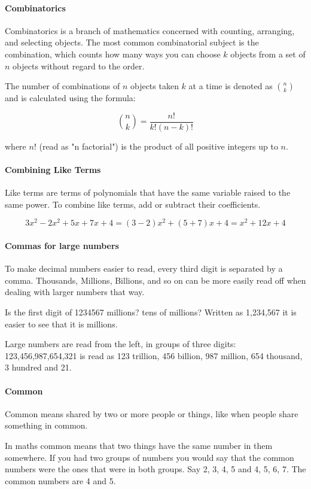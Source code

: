 \documentclass[12pt]{article}
\begin{document}
\paragraph{Combinatorics}
Combinatorics is a branch of mathematics concerned with counting, arranging, and selecting objects. The most common combinatorial subject is the combination, which counts how many ways you can choose \(k\) objects from a set of \(n\) objects without regard to the order.

The number of combinations of \(n\) objects taken \(k\) at a time is denoted as \(\binom{n}{k}\) and is calculated using the formula:

\[ \binom{n}{k} = \frac{n!}{k!(n-k)!} \]

where \(n!\) (read as "n factorial") is the product of all positive integers up to \(n\).

\paragraph{Combining Like Terms}
Like terms are terms of polynomials that have the same variable raised to the same power. To combine like terms, add or subtract their coefficients.

\[
3x^2 - 2x^2 + 5x + 7x + 4 = (3 - 2)x^2 + (5 + 7)x + 4 = x^2 + 12x + 4
\]

\paragraph{Commas for large numbers}
To make decimal numbers easier to read, every third digit is separated by a comma. Thousands, Millions, Billions, and so on can be more easily read off when dealing with larger numbers that way.

Is the first digit of 1234567 millions? tens of millions? Written as 1,234,567 it is easier to see that it is millions.

Large numbers are read from the left, in groups of three digits: 123,456,987,654,321 is read as 123 trillion, 456 billion, 987 million, 654 thousand, 3 hundred and 21.

\paragraph{Common} Common means shared by two or more people or things, like when people share something in common.

In maths common means that two things have the same number in them somewhere. If you had two groups of numbers you would say that the common numbers were the ones that were in both groups. Say 2, 3, 4, 5 and 4, 5, 6, 7. The common numbers are 4 and 5.
\end{document}
